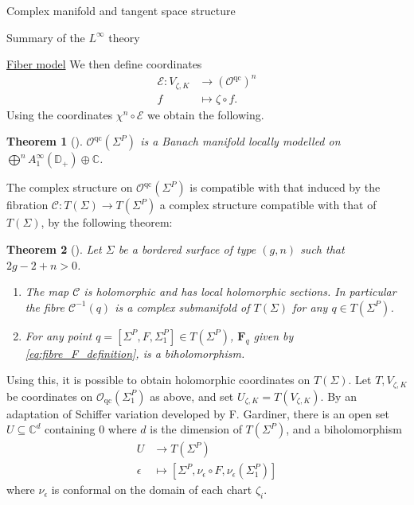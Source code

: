 \documentclass[12pt]{amsart}
\newcommand{\disk}{\ensuremath{\mathbb{D}} } %
\newcommand{\riem}{\Sigma}  %
\theoremstyle{plain}
\newtheorem{theorem}{Theorem}[section]
\theoremstyle{definition}
\theoremstyle{remark}
\numberwithin{equation}{section} %
\numberwithin{figure}{section} %
\begin{document}
\begin{section}{Complex manifold and tangent space structure}
\begin{subsection}{Summary of the $L^\infty$ theory}
\begin{subsubsection}{\underline{Fiber model}}
We then define coordinates
\begin{align}   \label{eq:T_coordinates_definition}
 \mathcal{E}:V_{\zeta,K} & \rightarrow (\mathcal{O}^{\mathrm{qc}})^n  \nonumber\\
 f & \mapsto \zeta \circ f. 
\end{align} 
Using the coordinates $\chi^n \circ \mathcal{E}$ we obtain the following. 
\begin{theorem}[\cite{RSnonoverlapping}]
  $\mathcal{O}^{\mathrm{qc}}({\riem}^P)$ is a Banach manifold  locally modelled on $\bigoplus^nA_1^\infty(\disk_+) \oplus \mathbb{C}$. 
\end{theorem}

The complex structure on $\mathcal{O}^{\mathrm{qc}}(\riem^P)$ is compatible with that induced by the fibration $\mathcal{C}:T(\riem) \rightarrow T(\riem^P)$ a complex structure compatible with that of $T(\riem)$, by the following theorem:  

\begin{theorem}[\cite{RadnellSchippers_fiber}]  \label{th:fiber_proj_holo_classical} Let $\riem$ be a bordered surface of type $(g,n)$ such that $2g-2+n>0$.
\begin{enumerate}[font=\upshape]
 \item The map $\mathcal{C}$ is holomorphic and has local holomorphic sections. In particular the fibre $\mathcal{C}^{-1}(q)$ is a complex submanifold of $T(\riem)$ for any $q \in T(\riem^P)$. 
 \item 
   For any point $q=[\riem^P,F,\riem_1^P] \in T(\riem^P)$, $\mathbf{F}_q$ given by \eqref{eq:fibre_F_definition}, is a biholomorphism. 
\end{enumerate}
\end{theorem}

Using this, it is possible to obtain holomorphic coordinates on $T(\riem)$. Let $T,V_{\zeta,K}$ be coordinates on $\mathcal{O}_{\mathrm{qc}}(\riem^P_1)$ as above, and set $U_{\zeta,K}= T (V_{\zeta,K})$. By an adaptation of Schiffer variation developed by F. Gardiner, there is an open set $U \subseteq \mathbb{C}^d$ containing $0$ where $d$ is the dimension of $T(\riem^P)$, and a biholomorphism 
\begin{align*}
    U & \rightarrow T(\riem^P) \\
    \epsilon & \mapsto [\riem^P,
\nu_\epsilon \circ F,\nu_\epsilon(\riem^P_1)]
\end{align*}
where $\nu_\epsilon$ is conformal on the domain of each chart $\zeta_i$. 


\end{subsubsection}
\end{subsection}
\end{section}
\end{document}
